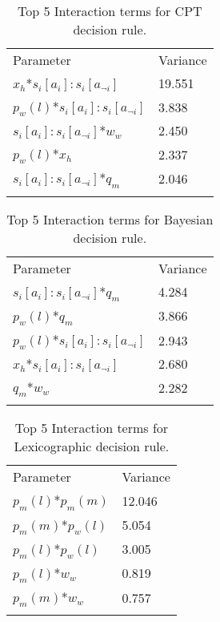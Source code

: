 \begin{table}[h]
\caption{Top 5 Interaction terms for \ac{CPT} decision rule.}
\label{tab:sa_interaction_prospect_group_iqr}
\begin{tabular} {ll}
\hline\noalign{\smallskip}
Parameter & Variance \\ 
\noalign{\smallskip}\svhline\noalign{\smallskip}

\(x_{h}\)*\(s_{i}[a_{i}]:s_{i}[a_{\neg i}]\) & 19.551\\
\(p_{w}(l)\)*\(s_{i}[a_{i}]:s_{i}[a_{\neg i}]\) & 3.838\\
\(s_{i}[a_{i}]:s_{i}[a_{\neg i}]\)*\(w_{w}\) & 2.450\\
\(p_{w}(l)\)*\(x_{h}\) & 2.337\\
\(s_{i}[a_{i}]:s_{i}[a_{\neg i}]\)*\(q_{m}\) & 2.046\\
\noalign{\smallskip}\hline\noalign{\smallskip}
\end{tabular}
\end{table}

\begin{table}[H]
\caption{Top 5 Interaction terms for Bayesian decision rule. \label{tab:sa_interaction_sharing_group_iqr}}
\begin{tabular} {ll}
\hline\noalign{\smallskip}
Parameter & Variance \\
\noalign{\smallskip}\svhline\noalign{\smallskip}
\(s_{i}[a_{i}]:s_{i}[a_{\neg i}]\)*\(q_{m}\) & 4.284\\
\(p_{w}(l)\)*\(q_{m}\) & 3.866\\
\(p_{w}(l)\)*\(s_{i}[a_{i}]:s_{i}[a_{\neg i}]\) & 2.943\\
\(x_{h}\)*\(s_{i}[a_{i}]:s_{i}[a_{\neg i}]\) & 2.680\\
\(q_{m}\)*\(w_{w}\) & 2.282\\
\noalign{\smallskip}\hline\noalign{\smallskip}
\end{tabular}
\end{table}

\begin{table}[H]
\caption{Top 5 Interaction terms for Lexicographic decision rule. \label{tab:sa_interaction_lexic_group_iqr}}
\begin{tabular} {ll}
\hline\noalign{\smallskip}
Parameter & Variance \\
\noalign{\smallskip}\svhline\noalign{\smallskip}
\(p_{m}(l)\)*\(p_{m}(m)\) & 12.046\\
\(p_{m}(m)\)*\(p_{w}(l)\) & 5.054\\
\(p_{m}(l)\)*\(p_{w}(l)\) & 3.005\\
\(p_{m}(l)\)*\(w_{w}\) & 0.819\\
\(p_{m}(m)\)*\(w_{w}\) & 0.757\\
\noalign{\smallskip}\hline\noalign{\smallskip}
\end{tabular}
\end{table}

